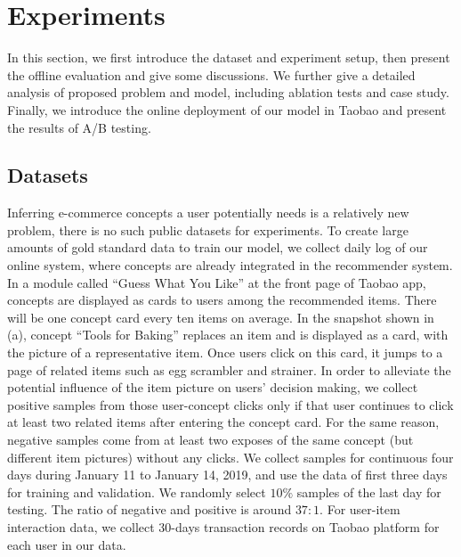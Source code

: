 \section{Experiments}
\label{sec:eval}

In this section, we first introduce the dataset and experiment setup,
then present the offline evaluation and give some discussions.
We further give a detailed analysis of proposed problem and model, 
including ablation tests and case study.
Finally, we introduce the online deployment of our model in Taobao and present the results of A/B testing.

\subsection{Datasets}

Inferring e-commerce concepts a user potentially needs is a relatively new problem, 
there is no such public datasets for experiments.
To create large amounts of gold standard data to train our model, 
we collect daily log of our online system, 
where concepts are already integrated in the recommender system. 
In a module called ``Guess What You Like'' at the front page of Taobao app, concepts are displayed as cards to users among the recommended items.
There will be one concept card every ten items on average.
In the snapshot shown in (a), concept ``Tools for Baking'' replaces an item and is displayed as a card, with the picture of a representative item.
Once users click on this card, 
it jumps to a page of related items such as egg scrambler and strainer.
In order to alleviate the potential influence of the item picture on users' decision making,
we collect positive samples from those user-concept clicks
only if that user continues to click at least two related items after entering the concept card.
For the same reason, negative samples come from at least two exposes of the same concept (but different item pictures) without any clicks.
We collect samples for continuous four days during January 11 to January 14, 2019, and use the data of first three days for training and validation. 
We randomly select $10\%$ samples of the last day for testing.
The ratio of negative and positive is around $37:1$.
For user-item interaction data, we collect 30-days transaction records on Taobao platform for each user in our data.
